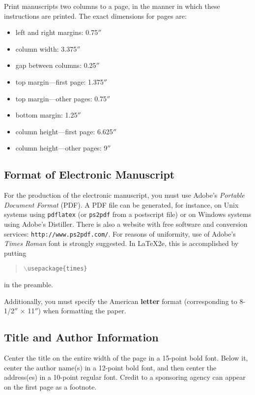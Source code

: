 \documentclass[letterpaper]{article}
\begin{document}
Print manuscripts two columns to a page, in the manner in which these
instructions are printed. The exact dimensions for pages are:
\begin{itemize}
\item left and right margins: 0.75$''$
\item column width: 3.375$''$
\item gap between columns: 0.25$''$
\item top margin---first page: 1.375$''$
\item top margin---other pages: 0.75$''$
\item bottom margin: 1.25$''$
\item column height---first page: 6.625$''$
\item column height---other pages: 9$''$
\end{itemize}

\subsection{Format of Electronic Manuscript}

For the production of the electronic manuscript, you must use Adobe's
{\em Portable Document Format} (PDF). A PDF file can be generated, for
instance, on Unix systems using {\tt pdflatex} 
(or {\tt ps2pdf} from a postscript file) or on Windows systems
using Adobe's Distiller. There is also a website with free software
and conversion services: {\tt http://www.ps2pdf.com/}. For reasons of
uniformity, use of Adobe's {\em Times Roman} font is strongly suggested. In
\LaTeX2e{}, this is accomplished by putting
\begin{quote} 
\mbox{\tt $\backslash$usepackage\{times\}}
\end{quote}
in the preamble.
  
Additionally, you must specify the American {\bf
letter} format (corresponding to 8-1/2$''$ $\times$ 11$''$) when
formatting the paper.

\subsection{Title and Author Information}

Center the title on the entire width of the page in a 15-point bold
font. Below it, center the author name(s) in a 12-point bold font, and
then center the address(es) in a 10-point regular font. Credit to a
sponsoring agency can appear on the first page as a footnote.
\end{document}
